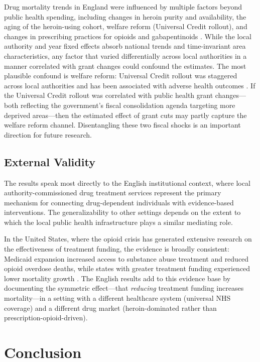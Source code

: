 \documentclass[12pt]{article}
\begin{document}
Drug mortality trends in England were influenced by multiple factors beyond public health spending, including changes in heroin purity and availability, the aging of the heroin-using cohort, welfare reform (Universal Credit rollout), and changes in prescribing practices for opioids and gabapentinoids \citep{ons2024drugsdeaths}. While the local authority and year fixed effects absorb national trends and time-invariant area characteristics, any factor that varied differentially across local authorities in a manner correlated with grant changes could confound the estimates. The most plausible confound is welfare reform: Universal Credit rollout was staggered across local authorities and has been associated with adverse health outcomes \citep{reeves2014}. If the Universal Credit rollout was correlated with public health grant changes---both reflecting the government's fiscal consolidation agenda targeting more deprived areas---then the estimated effect of grant cuts may partly capture the welfare reform channel. Disentangling these two fiscal shocks is an important direction for future research.

\subsection{External Validity}

The results speak most directly to the English institutional context, where local authority-commissioned drug treatment services represent the primary mechanism for connecting drug-dependent individuals with evidence-based interventions. The generalizability to other settings depends on the extent to which the local public health infrastructure plays a similar mediating role.

In the United States, where the opioid crisis has generated extensive research on the effectiveness of treatment funding, the evidence is broadly consistent: Medicaid expansion increased access to substance abuse treatment and reduced opioid overdose deaths, while states with greater treatment funding experienced lower mortality growth \citep{dave2021, bondurant2018}. The English results add to this evidence base by documenting the symmetric effect---that \textit{reducing} treatment funding increases mortality---in a setting with a different healthcare system (universal NHS coverage) and a different drug market (heroin-dominated rather than prescription-opioid-driven).


\section{Conclusion}
\end{document}
